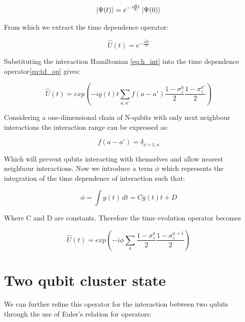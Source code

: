 \begin{equation}
\ket{\Psi (t)} = e^{- \frac{i \hat{H} t}{\hbar}} \ket{\Psi (0)}
\end{equation}

From which we extract the time dependence operator:

\begin{equation}
\label{eq:td_op}
\hat{U} (t) = e^{- \frac{i \hat{H} t}{\hbar}}
\end{equation}

Substituting the interaction Hamiltonian \eqref{eq:h_int} into the time dependence operator\eqref{eq:td_op} gives:

\begin{equation}
\label{eq:td_op_h}
\hat{U} (t) = exp\left(-i g(t) t \sum\limits_{a, a'} f(a - a') \frac{1 - \sigma^{a}_{z}}{2} \frac{1 - \sigma^{a'}_{z}}{2}\right)
\end{equation}

Considering a one-dimensional chain of N-qubits with only next neighbour interactions the interaction range can be expressed as:

\begin{equation}
f(a - a') = \delta _{a + 1, a}
\end{equation}

Which will prevent qubits interacting with themselves and allow nearest neighbour interactions. Now we introduce a term $\phi$ which represents the integration of the time dependence of interaction such that:

\begin{equation}
\phi = \int g(t) \, dt = C g(t) t + D
\end{equation}

Where C and D are constants. Therefore the time evolution operator becomes

\begin{equation}
\label{eq:td_op_phi}
\hat{U} (t) = exp\left(-i \phi \sum\limits_{a} \frac{1 - \sigma^{a}_{z}}{2} \frac{1 - \sigma^{a + 1}_{z}}{2}\right)
\end{equation}

 


\section{Two qubit cluster state}

We can further refine this operator for the interaction between two qubits through the use of Euler's relation for operators:

